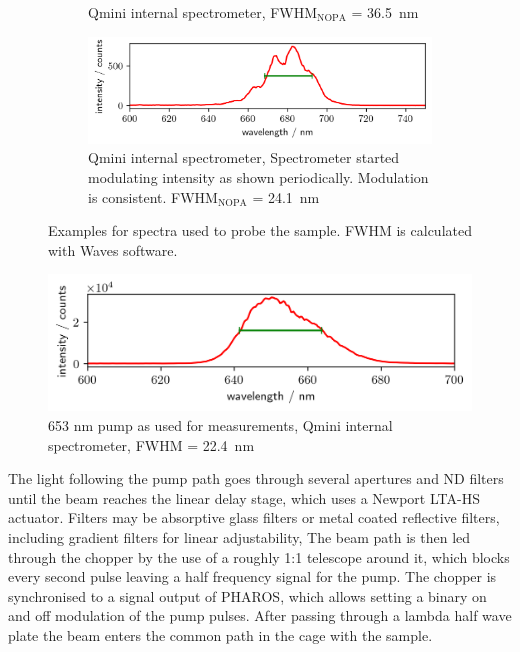 \documentclass[twoside,openright]{scrreprt}
\begin{document}
\begin{figure}[hbtp]
\begin{subfigure}[b]{\textwidth}
\caption{Qmini internal spectrometer, FWHM$_{\mathrm{NOPA}}$ = \SI{36.5}{\nano\meter}}
\end{subfigure}
\begin{subfigure}[b]{\textwidth}
\centering
\includegraphics[scale=1]{images/spectra/2024-02-05/probe_3H_680nm.png}
\caption{Qmini internal spectrometer, Spectrometer started modulating intensity as shown periodically. Modulation is consistent. FWHM$_{\mathrm{NOPA}}$ = \SI{24.1}{\nano\meter}\label{fig:spectrometerMalfunction}}
\end{subfigure}
\caption{Examples for spectra used to probe the sample. FWHM is calculated with Waves software.\label{fig:probeSpectra}}
\end{figure}

\begin{figure}[hbt]
\centering
\includegraphics[scale=1]{images/spectra/2024-02-05/pump_2H_653nm.png}
\caption{653 nm pump as used for measurements, Qmini internal spectrometer, FWHM = \SI{22.4}{\nano\meter}\label{fig:specRefPump}}
\end{figure}

The light following the pump path goes through several apertures and ND filters until the beam reaches the linear delay stage, which uses a Newport LTA-HS actuator.  Filters may be absorptive glass filters or metal coated reflective filters, including gradient filters for linear adjustability,  The beam path is then led through the chopper by the use of a roughly 1:1 telescope around it, which blocks every second pulse leaving a half frequency signal for the pump. The chopper is synchronised to a signal output of PHAROS, which allows setting a binary on and off modulation of the pump pulses. After passing through a lambda half wave plate the beam enters the common path in the cage with the sample.
\end{document}
